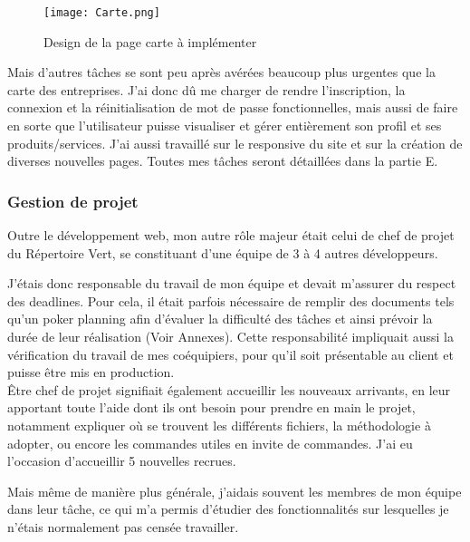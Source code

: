 \begin{figure}[H]
    \centering
    \texttt{[image: Carte.png]}
    \caption{Design de la page carte à implémenter}
\end{figure}


Mais d'autres tâches se sont peu après avérées beaucoup plus urgentes que la carte des entreprises. J'ai donc dû me charger de rendre l'inscription, la connexion et la réinitialisation de mot de passe fonctionnelles, 
mais aussi de faire en sorte que l'utilisateur puisse visualiser et gérer entièrement son profil et ses produits/services. J'ai aussi travaillé sur le responsive du site et sur la création de diverses nouvelles pages. Toutes mes tâches seront détaillées dans la partie E.

\subsubsection{Gestion de projet}

Outre le développement web, mon autre rôle majeur était celui de chef de projet du Répertoire Vert, se constituant d'une équipe de 3 à 4 autres développeurs.

J'étais donc responsable du travail de mon équipe et devait m'assurer du respect des deadlines. 
Pour cela, il était parfois nécessaire de remplir des documents tels qu'un poker planning afin d'évaluer la difficulté des tâches et ainsi prévoir la durée de leur réalisation (Voir Annexes).
Cette responsabilité impliquait aussi la vérification du travail de mes coéquipiers, pour qu'il soit présentable au client et puisse être mis en production.\\

Être chef de projet signifiait également accueillir les nouveaux arrivants, en leur apportant toute l'aide dont ils ont besoin pour prendre en main le projet, notamment expliquer où se trouvent les différents fichiers, la méthodologie à adopter, ou encore les commandes utiles en invite de commandes. J'ai eu l'occasion d'accueillir 5 nouvelles recrues.

Mais même de manière plus générale, j'aidais souvent les membres de mon équipe dans leur tâche, ce qui m'a permis d'étudier des fonctionnalités sur lesquelles je n'étais normalement pas censée travailler.\\

